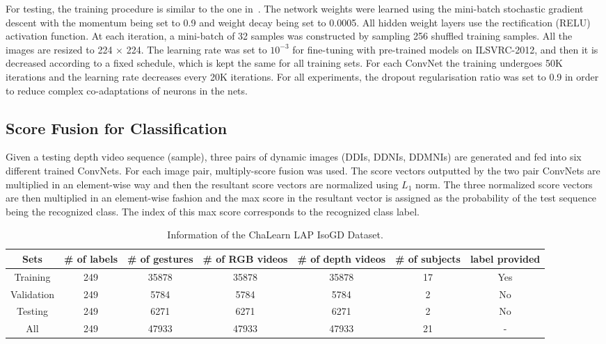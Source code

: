 \documentclass[10pt, a4paper, conference]{IEEEtran}
\begin{document}
For testing, the training procedure is similar to the one in~\cite{simonyan2014very}. The network weights were learned using the mini-batch stochastic gradient descent with the momentum being set to 0.9 and weight decay being set to 0.0005. All hidden weight layers use the rectification (RELU) activation function. At each iteration, a mini-batch of 32 samples was constructed by sampling 256 shuffled training samples. All the images are resized to 224 $\times$ 224. The learning rate was set to $10^{-3}$ for fine-tuning with pre-trained models on ILSVRC-2012, and then it is decreased according to a fixed schedule, which is kept the same for all training sets. For each ConvNet the training undergoes 50K iterations and the learning rate decreases every 20K iterations. For all experiments, the dropout regularisation ratio was set to 0.9 in order to reduce complex co-adaptations of neurons in the nets.

\subsection{Score Fusion for Classification}

Given a testing depth video sequence (sample), three pairs of dynamic images (DDIs, DDNIs, DDMNIs) are generated and fed into six different trained ConvNets. For each image pair, multiply-score fusion was used. The score vectors outputted by the two pair ConvNets are multiplied in an element-wise  way and then the resultant score vectors are normalized using $L_{1}$ norm. The three normalized score vectors are then multiplied in an element-wise fashion and the max score in the resultant vector is assigned as the probability of the test sequence being the recognized class. The index of this max score corresponds to the recognized class label.

\begin{table*}[!ht]
\centering
\caption{Information of the ChaLearn LAP IsoGD Dataset. \label{table1}}
\begin{tabular}{|c|c|c|c|c|c|c|}
\hline
Sets &\# of labels &\# of gestures & \# of RGB videos & \# of depth videos & \# of subjects & label provided \\
\hline
Training & 249 & 35878 & 35878 & 35878 & 17 & Yes \\
\hline
Validation & 249 & 5784 & 5784 & 5784 & 2 & No \\
\hline
Testing & 249 &  6271 & 6271 & 6271 & 2 & No \\
\hline
All & 249 & 47933 & 47933 & 47933 & 21 & - \\
\hline
\end{tabular}
\end{table*}
\end{document}
